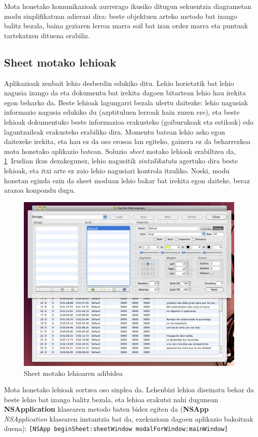Mota honetako komunikazioak aurrerago ikusiko ditugun sekuentzia diagrametan modu sinplifikatuan adierazi dira: beste objektuen arteko metodo bat izango balitz bezala, baina geziaren lerroa marra soil bat izan ordez marra eta puntuak tartekatzen dituena erabiliz.

\subsection{Sheet motako lehioak}
Aplikazioak zenbait lehio desberdin edukiko ditu. Lehio horietatik bat lehio nagusia izango da eta dokumentu bat irekita dagoen bitartean lehio hau irekita egon beharko da. Beste lehioak lagungarri bezala ulertu daitezke: lehio nagusiak informazio nagusia edukiko du (azptituluen lerroak hain zuzen ere), eta beste lehioak dokumentuko beste informazioa erakusteko (goiburukoak eta estiloak) edo laguntzaileak erakusteko erabiliko dira. Momentu batean lehio asko egon daitezeke irekita, eta hau ez da oso erosoa lan egiteko, gainera ez da beharrezkoa mota honetako aplikazio batean. Soluzio \textit{sheet} motako lehioak erabiltzea da, \ref{sheet}~Irudian ikus dezakegunez, lehio nagusitik \textit{zintzilikatuta} agertuko dira beste lehioak, eta itxi arte ez zaio lehio nagusiari kontrola itzuliko. Noski, modu honetan eginda ezin da sheet moduan lehio bakar bat irekita egon daiteke, beraz arazoa konpondu dugu.
\begin{figure}[htp]
\begin{center}
\includegraphics[scale=0.4]{Pictures/Chapter4/Diseinua/Sheet.png}
\caption{Sheet motako lehioaren adibidea}
\label{sheet}
\end{center}
\end{figure}
Mota honetako lehioak sortzea oso sinplea da. Lehenbizi lehioa diseinatu behar da beste lehio bat izango balitz bezala, eta lehioa erakutsi nahi dugunean \textbf{NSApplication} klasearen metodo baten bidez egiten da (\textbf{NSApp} \textit{NSApplication} klasearen instantzia bat da, exekuzioan dagoen aplikazio bakoitzak duena):
\texttt{[NSApp beginSheet:sheetWindow modalForWindow:mainWindow]}

